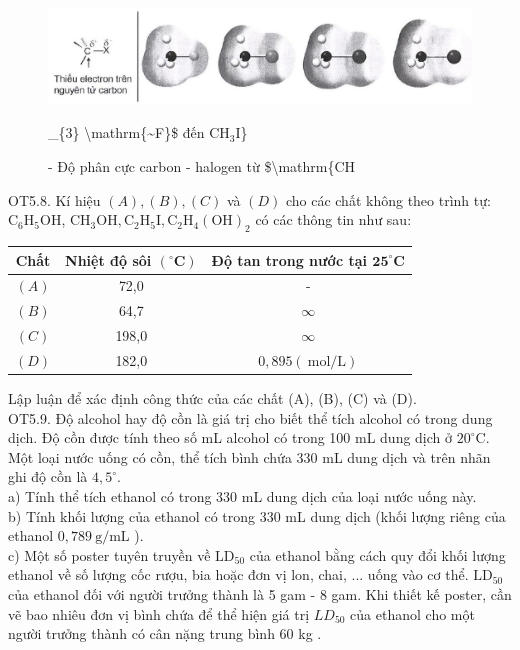 \documentclass[10pt]{article}
\begin{document}
\begin{figure}[h]
\begin{center}
  \includegraphics[width=\textwidth]{2025_10_23_ae7aef68fb3b41082d29g-42(1)}
\captionsetup{labelformat=empty}
\caption{- Độ phân cực carbon - halogen từ \$\textbackslash mathrm\{CH}\_\{3\} \textbackslash mathrm\{\~{}F\}\$ đến $\mathrm{CH}_{3} \mathrm{I}$\}\end{center}
\end{figure}

OT5.8. Kí hiệu $(A),(B),(C)$ và $(D)$ cho các chất không theo trình tự: $\mathrm{C}_{6} \mathrm{H}_{5} \mathrm{OH}$, $\mathrm{CH}_{3} \mathrm{OH}, \mathrm{C}_{2} \mathrm{H}_{5} \mathrm{I}, \mathrm{C}_{2} \mathrm{H}_{4}(\mathrm{OH})_{2}$ có các thông tin như sau:

\begin{center}
\begin{tabular}{|c|c|c|}
\hline
Chất & Nhiệt độ sôi $\left({ }^{\circ} \mathbf{C}\right)$ & Độ tan trong nước tại $\mathbf{2 5}^{\circ} \mathbf{C}$ \\
\hline
$(A)$ & 72,0 & - \\
\hline
$(B)$ & 64,7 & $\infty$ \\
\hline
$(C)$ & 198,0 & $\infty$ \\
\hline
$(D)$ & 182,0 & $0,895(\mathrm{~mol} / \mathrm{L})$ \\
\hline
\end{tabular}
\end{center}

Lập luận để xác định công thức của các chất (A), (B), (C) và (D).\\
OT5.9. Độ alcohol hay độ cồn là giá trị cho biết thể tích alcohol có trong dung dịch. Độ cồn được tính theo số mL alcohol có trong 100 mL dung dịch ở $20^{\circ} \mathrm{C}$.\\
Một loại nước uống có cồn, thể tích bình chứa 330 mL dung dịch và trên nhãn ghi độ cồn là $4,5^{\circ}$.\\
a) Tính thể tích ethanol có trong 330 mL dung dịch của loại nước uống này.\\
b) Tính khối lượng của ethanol có trong 330 mL dung dịch (khối lượng riêng của ethanol $0,789 \mathrm{~g} / \mathrm{mL}$ ).\\
c) Một số poster tuyên truyền về $\mathrm{LD}_{50}$ của ethanol bằng cách quy đổi khối lượng ethanol về số lượng cốc rượu, bia hoặc đơn vị lon, chai, ... uống vào cơ thể. $\mathrm{LD}_{50}$ của ethanol đối với người trưởng thành là 5 gam - 8 gam. Khi thiết kế poster, cần vẽ bao nhiêu đơn vị bình chứa để thể hiện giá trị $L D_{50}$ của ethanol cho một người trưởng thành có cân nặng trung bình 60 kg .
\end{document}
